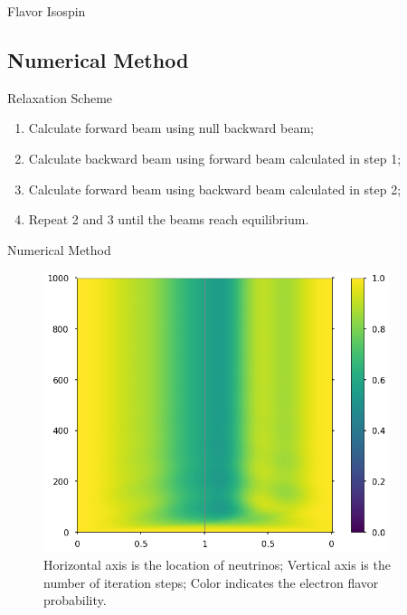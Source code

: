 \documentclass[9pt]{beamer}
\begin{document}
\begin{darkframes}
\begin{frame}{Flavor Isospin}
\end{frame}


\subsection{Numerical Method}

\begin{frame}{Relaxation Scheme}

\begin{tcolorbox}[title=Algorithm,standard jigsaw,
    opacityback=0]
   \begin{enumerate}
      \item Calculate forward beam using null backward beam;
      \item Calculate backward beam using forward beam calculated in step 1;
      \item Calculate forward beam using backward beam calculated in step 2;
      \item Repeat 2 and 3 until the beams reach equilibrium.
   \end{enumerate}
\end{tcolorbox}




\end{frame}




\begin{frame}{Numerical Method}

\begin{tcolorbox}
\begin{figure}
   \includegraphics[width=0.9\textwidth]{assets/relax-color}
   \caption*{\color{black}Horizontal axis is the location of neutrinos; Vertical axis is the number of iteration steps; Color indicates the electron flavor probability.}
\end{figure}
\end{tcolorbox}


\end{frame}
\end{darkframes}
\end{document}
